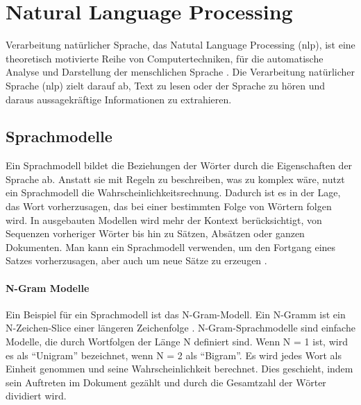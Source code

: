 \documentclass[
        ngerman,
        paper=a4,
        numbers=noendperiod,
]{scrreprt}
\begin{document}
\section{Natural Language Processing}

Verarbeitung natürlicher Sprache, das Natutal Language Processing (\ac{nlp}), ist eine theoretisch motivierte Reihe von Computertechniken, für die automatische Analyse und Darstellung der menschlichen Sprache \citep[S. 48]{cambria2014jumping}. Die Verarbeitung natürlicher Sprache (\ac{nlp}) zielt darauf ab, Text zu lesen oder der Sprache zu hören und daraus aussagekräftige Informationen zu extrahieren. 

\subsection{Sprachmodelle}
Ein Sprachmodell bildet die Beziehungen der Wörter durch die Eigenschaften der Sprache ab. Anstatt sie mit Regeln zu beschreiben, was zu komplex wäre, nutzt ein Sprachmodell die Wahrscheinlichkeitsrechnung. Dadurch ist es in der Lage, das Wort vorherzusagen, das bei einer bestimmten Folge von Wörtern folgen wird. In ausgebauten Modellen wird mehr der Kontext berücksichtigt, von Sequenzen vorheriger Wörter bis hin zu Sätzen, Absätzen oder ganzen Dokumenten. Man kann ein Sprachmodell verwenden, um den Fortgang eines Satzes vorherzusagen, aber auch um neue Sätze zu erzeugen \citep{goodman2001bit}.

\paragraph{N-Gram Modelle}
Ein Beispiel für ein Sprachmodell ist das N-Gram-Modell. Ein N-Gramm ist ein N-Zeichen-Slice einer längeren Zeichenfolge \citep{cavnar1994n}. N-Gram-Sprachmodelle sind einfache Modelle, die durch Wortfolgen der Länge N definiert sind. Wenn N = 1 ist, wird es als \enquote{Unigram} bezeichnet, wenn N = 2 als \enquote{Bigram}. Es wird jedes Wort als Einheit genommen und seine Wahrscheinlichkeit berechnet. Dies geschieht, indem sein Auftreten im Dokument gezählt und durch die Gesamtzahl der Wörter dividiert wird. 
\end{document}
